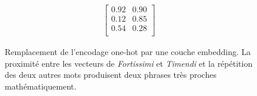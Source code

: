 \begin{figure}[h]
\begin{minipage}{.32\linewidth}
\begin{equation*}
\begin{matrix}
            \begin{bmatrix}
            0.92 & 0.90 \\
            0.12 & 0.85 \\ 
            0.54 & 0.28 \\ 
            \end{bmatrix}
            
            \end{matrix}
        \end{equation*}
    \end{minipage}
    \caption{Remplacement de l'encodage one-hot par une couche  embedding. La proximité entre les vecteurs de \textit{Fortissimi} et \textit{Timendi} et la répétition des deux autres mots produisent deux phrases très proches mathématiquement.}
    \label{figure:deep-learning:embeddings-encoding}
\end{figure}
